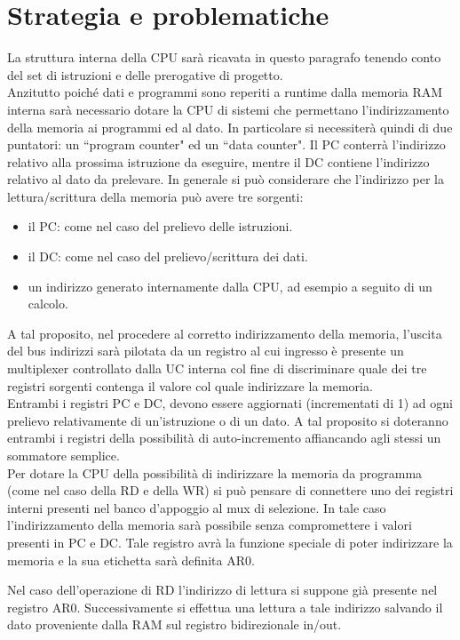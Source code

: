 \section{Strategia e problematiche}
La struttura interna della CPU sarà ricavata in questo paragrafo tenendo conto del set di istruzioni e delle prerogative di progetto.\\
Anzitutto poiché dati e programmi sono reperiti a runtime dalla memoria RAM interna sarà necessario dotare la CPU di sistemi che permettano l'indirizzamento della memoria ai programmi ed al dato. In particolare si necessiterà quindi di due puntatori: un \textquotedblleft program counter" ed un \textquotedblleft data counter". Il PC conterrà l'indirizzo relativo alla prossima istruzione da eseguire, mentre il DC contiene l'indirizzo relativo al dato da prelevare.
In generale si può considerare che l'indirizzo per la lettura/scrittura della memoria può avere tre sorgenti:
\begin{itemize}
	\item il PC: come nel caso del prelievo delle istruzioni.
	\item il DC: come nel caso del prelievo/scrittura dei dati.
	\item un indirizzo generato internamente dalla CPU, ad esempio a seguito di un calcolo.
\end{itemize}
A tal proposito, nel procedere al corretto indirizzamento della memoria, l'uscita del bus indirizzi sarà pilotata da un registro al cui ingresso è presente un multiplexer controllato dalla UC interna col fine di discriminare quale dei tre registri sorgenti contenga il valore col quale indirizzare la memoria.\\
Entrambi i registri PC e DC, devono essere aggiornati (incrementati di 1) ad ogni prelievo relativamente di un'istruzione o di un dato. A tal proposito si doteranno entrambi i registri della possibilità di auto-incremento affiancando agli stessi un sommatore semplice.\\
Per dotare la CPU della possibilità di indirizzare la memoria da programma (come nel caso della RD e della WR) si può pensare di connettere uno dei registri interni presenti nel banco d'appoggio al mux di selezione. In tale caso l'indirizzamento della memoria sarà possibile senza compromettere i valori presenti in PC e DC. Tale registro avrà la funzione speciale di poter indirizzare la memoria e la sua etichetta sarà definita AR0.
\par \bigskip \noindent
Nel caso dell'operazione di RD l'indirizzo di lettura si suppone già presente nel registro AR0. Successivamente si effettua una lettura a tale indirizzo salvando il dato proveniente dalla RAM sul registro bidirezionale in/out.
